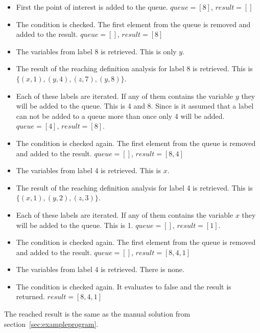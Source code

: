 \begin{itemize}
	\item First the point of interest is added to the queue. $queue=[8]$, $result=[]$
	\item The condition is checked. The first element from the queue is removed and added to the result. $queue=[]$, $result=[8]$
	\item The variables from label 8 is retrieved. This is only $y$.
	\item The result of the reaching definition analysis for label 8 is retrieved. This is $\{(x, 1), (y, 4), (z, 7), (y, 8)\}$.
	\item Each of these labels are iterated. If any of them contains the variable $y$ they will be added to the queue. This is 4 and 8. Since is it assumed that a label can not be added to a queue more than once only 4 will be added. $queue=[4]$, $result=[8]$.
	\item The condition is checked again. The first element from the queue is removed and added to the result. $queue=[]$, $result=[8,4]$
	\item The variables from label 4 is retrieved. This is $x$.
	\item The result of the reaching definition analysis for label 4 is retrieved. This is $\{(x, 1), (y, 2), (z, 3)\}$.
	\item Each of these labels are iterated. If any of them contains the variable $x$ they will be added to the queue. This is 1. $queue=[]$, $result=[1]$.
	\item The condition is checked again. The first element from the queue is removed and added to the result. $queue=[]$, $result=[8,4,1]$
	\item The variables from label 4 is retrieved. There is none.
	\item The condition is checked again. It evaluates to false and the result is returned. $result=[8,4,1]$
\end{itemize}
The reached result is the same as the manual solution from section~\ref{sec:exampleprogram}.